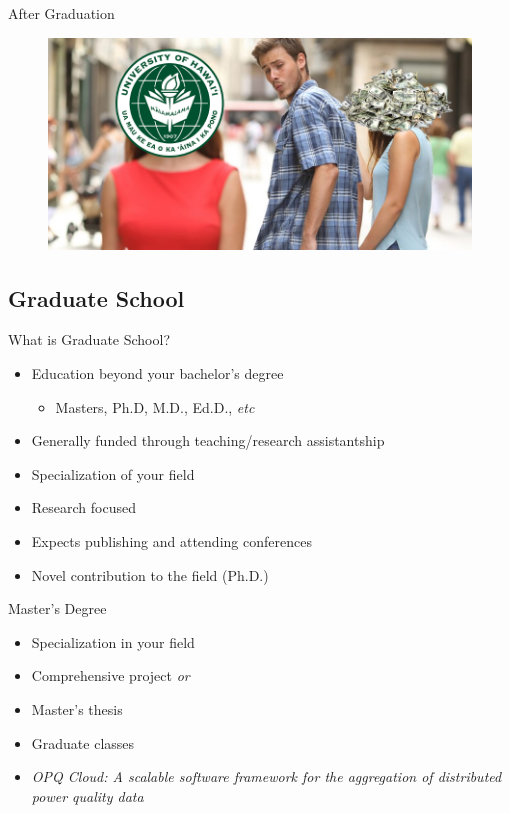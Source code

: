 \documentclass{beamer}
\begin{document}
\begin{frame}{After Graduation}
\begin{figure}
	\includegraphics[width=\linewidth]{img/uh.png}
\end{figure}
\end{frame}

\subsection{Graduate School}

\begin{frame}{What is Graduate School?}
\begin{itemize}
	\item Education beyond your bachelor's degree
	\begin{itemize}
		\item Masters, Ph.D, M.D., Ed.D., \emph{etc}
	\end{itemize}
	\item Generally funded through teaching/research assistantship
	\item Specialization of your field
	\item Research focused
	\item Expects publishing and attending conferences
	\item Novel contribution to the field (Ph.D.)
\end{itemize}
\end{frame}

\begin{frame}{Master's Degree}
	\begin{itemize}
		\item Specialization in your field
		\item Comprehensive project \emph{or}
		\item Master's thesis
		\item Graduate classes
		\item \emph{OPQ Cloud: A scalable software framework for the aggregation of distributed power quality data}
	\end{itemize}
\end{frame}
\end{document}

